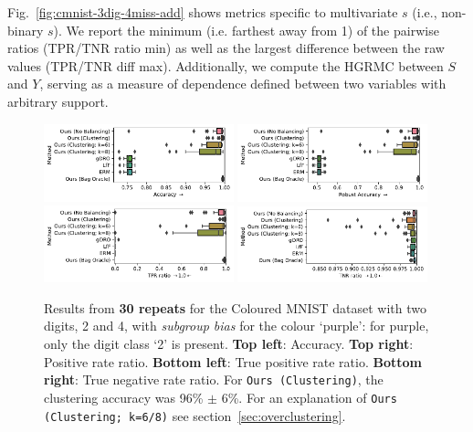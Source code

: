 Fig.~\ref{fig:cmnist-3dig-4miss-add} shows metrics specific to multivariate $s$ (i.e., non-binary
$s$). 
%
We report the minimum (i.e. farthest away from 1) of the pairwise ratios (\ac{TPR}/\ac{TNR} ratio
min) as well as the largest difference between the raw values (\ac{TPR}/\ac{TNR} diff max). 
%
Additionally, we compute the \ac{HGRMC} between $S$ and $Y$, serving as a measure of dependence
defined between two variables with arbitrary support.
%
\begin{figure}[htp]
  \centering
  \includegraphics[width=0.49\textwidth]{supmatch/figures/cmnist/subgroup_bias_oc/cmnist_2v4_partial_overcluster_acc.pdf}
  \includegraphics[width=0.49\textwidth]{supmatch/figures/cmnist/subgroup_bias_oc/cmnist_2v4_partial_overcluster_acc-min.pdf}
  \includegraphics[width=0.49\textwidth]{supmatch/figures/cmnist/subgroup_bias_oc/cmnist_2v4_partial_overcluster_tprr.pdf}
    \includegraphics[width=0.49\textwidth]{supmatch/figures/cmnist/subgroup_bias_oc/cmnist_2v4_partial_overcluster_tnrr.pdf}
  \caption{
    Results from \textbf{30 repeats} for the Coloured MNIST dataset with two digits, 2 and 4, with
    \emph{subgroup bias} for the colour `{\color{purple}purple}': for {\color{purple}purple}, only
    the digit class `2' is present.
    \textbf{Top left}: Accuracy.
    \textbf{Top right}: Positive rate ratio.
    \textbf{Bottom left}: True positive rate ratio.
    \textbf{Bottom right}: True negative rate ratio.
    For \texttt{Ours (Clustering)}, the clustering accuracy was 96\% $\pm$ 6\%.
    For an explanation of \texttt{Ours (Clustering; k=6/8)} see section~\ref{sec:overclustering}.
  }%
  \label{fig:cmnist-2v4-partial-add}
\end{figure}
